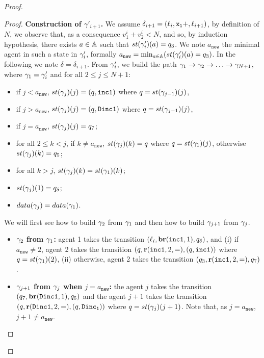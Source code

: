 \documentclass[a4paper,UKenglish,cleveref, autoref, thm-restate]{lipics-v2021}
\begin{document}
\begin{proof}
\begin{proof}
		\textbf{Construction of $\gamma'_{i+1}$.}
		We assume $\delta_{i+1} = (\ell_i, \mathtt{x_1}+, \ell_{i+1})$, by definition of $N$, we observe that, as a consequence $v_1^i + v_2^i < N$, and so, by induction hypothesis, there exists $a \in \mathbb{A}$ such that $\st{\config'_i}(a) = q_3$. We note $a_{\mathtt{new}}$ the minimal agent in such a state in $\gamma'_i$, formally $a_{\mathtt{new}} = \min_{a \in \agents}(\st{\config'_i}(a) = q_3)$. In the following we note $\delta = \delta_{i+1}$. From $\gamma'_i$, we build the path $\gamma_{1} \xrightarrow{} \gamma_{2} \xrightarrow{} \dots \xrightarrow{} \gamma_{N+1}$, where $\gamma_{1} = \gamma'_i$ and for all $2 \leq j \leq N+1$:
		\begin{itemize}
			\item if $j< a_{\mathtt{new}}$, $\st{\config_j}(j) = (q, \mathtt{inc1})$ where $q = \st{\config_{j-1}}(j)$, 
			\item if $j> a_{\mathtt{new}}$, $\st{\config_j}(j) = (q, \mathtt{Dinc1})$ where $q = \st{\config_{j-1}}(j)$,
			\item if $j = a_{\mathtt{new}}$, $\st{\config_j}(j) = q_7$;
			\item for all $2 \leq k < j$, if $k\ne a_{\mathtt{new}}$, $\st{\config_j}(k) = q$ where $q = \st{\config_{1}}(j)$, otherwise $\st{\config_j}(k) = q_5$;
			\item for all $k > j$,  $\st{\config_j}(k) = \st{\config_1}(k)$;
			\item $\st{\config_j}(1) = q_\delta$;
			\item $\data{\config_j}= \data{\config_1}$.
		\end{itemize}
		We will first see how to build $\gamma_2$ from $\gamma_1$ and then how to build $\gamma_{j+1}$ from $\gamma_j$.
		\begin{itemize}
			\item\textbf{$\gamma_2$ from $\gamma_1$:} agent 1 takes the transition $(\ell_i, \textbf{br}(\mathtt{inc1}, 1), q_{\delta})$, and (i) if $a_{\mathtt{new}} \ne 2$, agent 2 takes the transition $(q, \textbf{r}(\mathtt{inc1}, 2, =), (q,\mathtt{inc1}))$ where $q = \st{\config_1}(2)$, (ii) otherwise, agent 2 takes the transition $(q_3, \textbf{r}(\mathtt{inc1}, 2, =), q_7)$.
			
			\item\textbf{$\gamma_{j+1}$ from $\gamma_j$ when $j= a_{\mathtt{new}}$:} the agent $j$ takes the transition $(q_7, \textbf{br}(\mathtt{Dinc1}, 1), q_5)$ and the agent $j+1$ takes the transition $(q, \textbf{r}(\mathtt{Dinc1}, 2, =), (q,\mathtt{Dinc_1}))$ where $q = \st{\config_j}(j+1)$. Note that, as $j = a_{\mathtt{new}}$, $j+1 \not = a_{\mathtt{new}}$.
			

\end{itemize}
\end{proof}
\end{proof}
\end{document}
